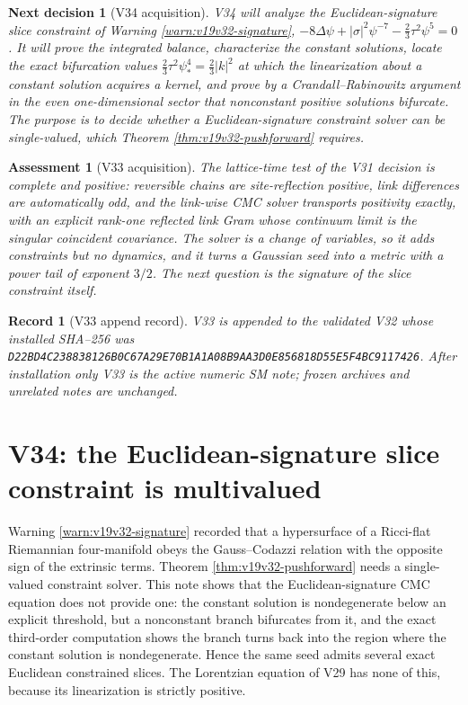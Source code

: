 \documentclass[11pt]{article}
\newtheorem{decision}[theorem]{Next decision}
\newtheorem{assessment}[theorem]{Assessment}
\newtheorem{record}[theorem]{Record}
\theoremstyle{remark}
\begin{document}
\begin{decision}[V34 acquisition]
\label{dec:v19v33-next}
V34 will analyze the Euclidean-signature slice constraint of Warning
\ref{warn:v19v32-signature},
\(-8\Delta\psi+|\sigma|^2\psi^{-7}-\tfrac23\tau^2\psi^5=0\).  It will
prove the integrated balance, characterize the constant solutions, locate
the exact bifurcation values \(\tfrac23\tau^2\psi_*^4=\tfrac23|k|^2\) at
which the linearization about a constant solution acquires a kernel, and
prove by a Crandall--Rabinowitz argument in the even one-dimensional
sector that nonconstant positive solutions bifurcate.  The purpose is to
decide whether a Euclidean-signature constraint solver can be
single-valued, which Theorem \ref{thm:v19v32-pushforward} requires.
\end{decision}

\begin{assessment}[V33 acquisition]
\label{ass:v19v33}
The lattice-time test of the V31 decision is complete and positive:
reversible chains are site-reflection positive, link differences are
automatically odd, and the link-wise CMC solver transports positivity
exactly, with an explicit rank-one reflected link Gram whose continuum
limit is the singular coincident covariance.  The solver is a change of
variables, so it adds constraints but no dynamics, and it turns a
Gaussian seed into a metric with a power tail of exponent \(3/2\).  The
next question is the signature of the slice constraint itself.
\end{assessment}

\begin{record}[V33 append record]
\label{rec:v19v33}
V33 is appended to the validated V32 whose installed SHA--256 was
\texttt{D22BD4C238838126B0C67A29E70B1A1A08B9AA3D0E856818D55E5F4BC9117426}.
After installation only V33 is the active numeric SM note; frozen
archives and unrelated notes are unchanged.
\end{record}


\section{V34: the Euclidean-signature slice constraint is multivalued}
\label{sec:v19v34}

Warning \ref{warn:v19v32-signature} recorded that a hypersurface of a
Ricci-flat Riemannian four-manifold obeys the Gauss--Codazzi relation
with the opposite sign of the extrinsic terms.  Theorem
\ref{thm:v19v32-pushforward} needs a single-valued constraint solver.
This note shows that the Euclidean-signature CMC equation does not
provide one: the constant solution is nondegenerate below an explicit
threshold, but a nonconstant branch bifurcates from it, and the exact
third-order computation shows the branch turns back into the region
where the constant solution is nondegenerate.  Hence the same seed admits
several exact Euclidean constrained slices.  The Lorentzian equation of
V29 has none of this, because its linearization is strictly positive.
\end{document}
